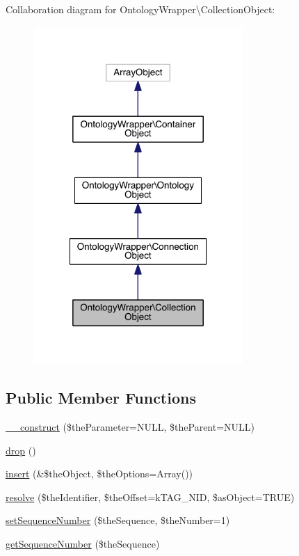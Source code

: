 Collaboration diagram for Ontology\-Wrapper\textbackslash{}Collection\-Object\-:
\nopagebreak
\begin{figure}[H]
\begin{center}
\leavevmode
\includegraphics[width=226pt]{class_ontology_wrapper_1_1_collection_object__coll__graph}
\end{center}
\end{figure}
\subsection*{Public Member Functions}
\begin{DoxyCompactItemize}
\item 
\hyperlink{class_ontology_wrapper_1_1_collection_object_a293d59b759d71c809a626cfd5371240f}{\-\_\-\-\_\-construct} (\$the\-Parameter=N\-U\-L\-L, \$the\-Parent=N\-U\-L\-L)
\item 
\hyperlink{class_ontology_wrapper_1_1_collection_object_aee9026b21f08ac0fcfb16f093a9f3235}{drop} ()
\item 
\hyperlink{class_ontology_wrapper_1_1_collection_object_adc0a8dd83621a9d68d005b2858112c74}{insert} (\&\$the\-Object, \$the\-Options=Array())
\item 
\hyperlink{class_ontology_wrapper_1_1_collection_object_a2e6eea553a4b562445ca2959df8d170c}{resolve} (\$the\-Identifier, \$the\-Offset=k\-T\-A\-G\-\_\-\-N\-I\-D, \$as\-Object=T\-R\-U\-E)
\item 
\hyperlink{class_ontology_wrapper_1_1_collection_object_a0868032610dd81c923f4a887ec46104d}{set\-Sequence\-Number} (\$the\-Sequence, \$the\-Number=1)
\item 
\hyperlink{class_ontology_wrapper_1_1_collection_object_a17487ff9e82b493434a074c787262df0}{get\-Sequence\-Number} (\$the\-Sequence)
\end{DoxyCompactItemize}
